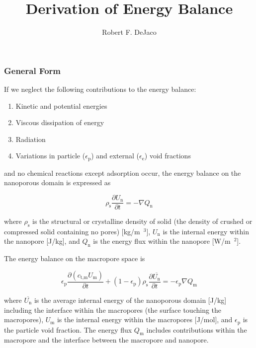 \documentclass[11pt]{article}
\author{Robert F. DeJaco}
\title{Derivation of Energy Balance}
\newcommand{\ee}{\epsilon_{\mathrm{e}}}
\newcommand{\ep}{\epsilon_{\mathrm{p}}}
\newcommand{\rs}{\rho_{\mathrm{s}}}
\newcommand{\textn}{\text{n}}
\newcommand{\textm}{\text{m}}
\newcommand{\ctm}{c_{\text{t,m}}}
\begin{document}
    \maketitle

    \subsubsection{General Form}

    If we neglect the following contributions to the energy balance:
    \begin{enumerate}
        \item Kinetic and potential energies
        \item Viscous dissipation of energy
        \item Radiation
        \item Variations in particle ($\ep$) and external ($\ee$) void fractions
    \end{enumerate}

    and no chemical reactions except adsorption occur, the
    energy balance on the nanoporous domain is expressed as~\cite{Walton2003}

    \begin{equation}
        \rs\frac{\partial U_\textn}{\partial t} = - \nabla Q_\textn
    \end{equation}

    where $\rho_{\mathrm{s}}$ is the structural or crystalline density of solid (the density of crushed or compressed solid containing no pores) [kg/m~$^3$],
    $U_\textn$ is the internal energy within the nanopore [J/kg],
    and $Q_\textn$ is the energy flux within the nanopore [W/m~$^2$].

    The energy balance on the macropore space is

    \begin{equation}
        \ep\frac{\partial (\ctm U_\textm)}{\partial t} + (1-\ep)\rs\frac{\partial \overline{U_\mathrm{n}}}{\partial t} = - \ep\nabla Q_\textm
    \end{equation}

    where $\overline{U_{\textn}}$ is the average internal energy of the nanoporous domain [J/kg]
    including the interface within the macropores (the surface touching the macropores),
    $U_\textm$ is the internal energy within the macropores [J/mol],
    and $\ep$ is the particle void fraction.
    The energy flux $Q_\textm$ includes contributions within the macropore and
    the interface between the macropore and nanopore.
\end{document}
